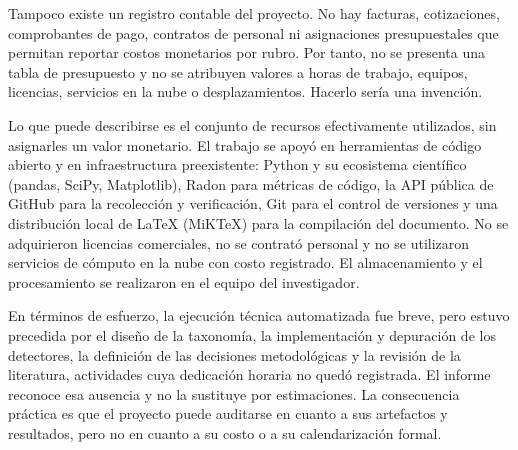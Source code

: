 Tampoco existe un registro contable del proyecto. No hay facturas, cotizaciones, comprobantes de pago, contratos de personal ni asignaciones presupuestales que permitan reportar costos monetarios por rubro. Por tanto, no se presenta una tabla de presupuesto y no se atribuyen valores a horas de trabajo, equipos, licencias, servicios en la nube o desplazamientos. Hacerlo sería una invención.

Lo que puede describirse es el conjunto de recursos efectivamente utilizados, sin asignarles un valor monetario. El trabajo se apoyó en herramientas de código abierto y en infraestructura preexistente: Python y su ecosistema científico (pandas, SciPy, Matplotlib), Radon para métricas de código, la API pública de GitHub para la recolección y verificación, Git para el control de versiones y una distribución local de LaTeX (MiKTeX) para la compilación del documento. No se adquirieron licencias comerciales, no se contrató personal y no se utilizaron servicios de cómputo en la nube con costo registrado. El almacenamiento y el procesamiento se realizaron en el equipo del investigador.

En términos de esfuerzo, la ejecución técnica automatizada fue breve, pero estuvo precedida por el diseño de la taxonomía, la implementación y depuración de los detectores, la definición de las decisiones metodológicas y la revisión de la literatura, actividades cuya dedicación horaria no quedó registrada. El informe reconoce esa ausencia y no la sustituye por estimaciones. La consecuencia práctica es que el proyecto puede auditarse en cuanto a sus artefactos y resultados, pero no en cuanto a su costo o a su calendarización formal.
